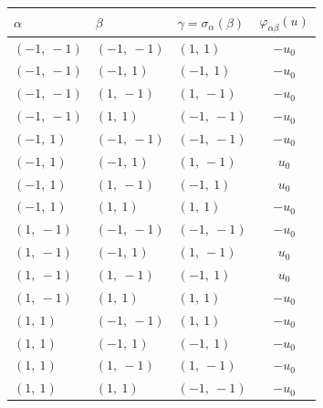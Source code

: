 \documentclass[11pt]{article}
\newcommand{\noi}{\noindent}
\theoremstyle{definition}
\begin{document}
\bigskip

\noi \noindent \begin{longtable}{|l|l|l|c|}
    \hline
    \textbf{$\alpha$} & \textbf{$\beta$} & \textbf{$\gamma = \sigma_{\alpha}(\beta)$} & $\varphi_{\alpha\beta}(u)$ \\
    \hline
    \endhead
    $\left( -1, \  -1\right)$ & $\left( -1, \  -1\right)$ & $\left( 1, \  1\right)$ & $- u_{0}$ \\
    \hline
    $\left( -1, \  -1\right)$ & $\left( -1, \  1\right)$ & $\left( -1, \  1\right)$ & $- u_{0}$ \\
    \hline
    $\left( -1, \  -1\right)$ & $\left( 1, \  -1\right)$ & $\left( 1, \  -1\right)$ & $- u_{0}$ \\
    \hline
    $\left( -1, \  -1\right)$ & $\left( 1, \  1\right)$ & $\left( -1, \  -1\right)$ & $- u_{0}$ \\
    \hline
    $\left( -1, \  1\right)$ & $\left( -1, \  -1\right)$ & $\left( -1, \  -1\right)$ & $- u_{0}$ \\
    \hline
    $\left( -1, \  1\right)$ & $\left( -1, \  1\right)$ & $\left( 1, \  -1\right)$ & $u_{0}$ \\
    \hline
    $\left( -1, \  1\right)$ & $\left( 1, \  -1\right)$ & $\left( -1, \  1\right)$ & $u_{0}$ \\
    \hline
    $\left( -1, \  1\right)$ & $\left( 1, \  1\right)$ & $\left( 1, \  1\right)$ & $- u_{0}$ \\
    \hline
    $\left( 1, \  -1\right)$ & $\left( -1, \  -1\right)$ & $\left( -1, \  -1\right)$ & $- u_{0}$ \\
    \hline
    $\left( 1, \  -1\right)$ & $\left( -1, \  1\right)$ & $\left( 1, \  -1\right)$ & $u_{0}$ \\
    \hline
    $\left( 1, \  -1\right)$ & $\left( 1, \  -1\right)$ & $\left( -1, \  1\right)$ & $u_{0}$ \\
    \hline
    $\left( 1, \  -1\right)$ & $\left( 1, \  1\right)$ & $\left( 1, \  1\right)$ & $- u_{0}$ \\
    \hline
    $\left( 1, \  1\right)$ & $\left( -1, \  -1\right)$ & $\left( 1, \  1\right)$ & $- u_{0}$ \\
    \hline
    $\left( 1, \  1\right)$ & $\left( -1, \  1\right)$ & $\left( -1, \  1\right)$ & $- u_{0}$ \\
    \hline
    $\left( 1, \  1\right)$ & $\left( 1, \  -1\right)$ & $\left( 1, \  -1\right)$ & $- u_{0}$ \\
    \hline
    $\left( 1, \  1\right)$ & $\left( 1, \  1\right)$ & $\left( -1, \  -1\right)$ & $- u_{0}$ \\
    \hline
\end{longtable}
\end{document}
